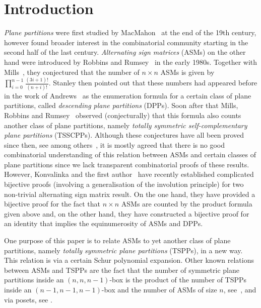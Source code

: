 \section{Introduction}
\emph{Plane partitions} were first studied by MacMahon~\cite{MacMahon97} at the end of the 19th century, however found broader interest in the combinatorial community starting in the second half of the last century. \emph{Alternating sign matrices} (ASMs) on the other hand were introduced by Robbins and Rumsey~\cite{RobbinsRumsey86} in the early 1980s. Together with Mills~\cite{MillsRobbinsRumsey82}, they conjectured that the number of $n \times n$ ASMs is given by $\prod_{i=0}^{n-1} \frac{(3i+1)!}{(n+i)!}$. Stanley then pointed out that these numbers had appeared before in the work of Andrews~\cite{Andrews79} as the enumeration formula for a certain class of plane partitions, called \emph{descending plane partitions} (DPPs). Soon after that Mills, Robbins and Rumsey~\cite{MillsRobbinsRumsey86} observed (conjecturally) that this formula also counts another class of plane partitions, namely \emph{totally symmetric self-complementary plane partitions} (TSSCPPs). Although these conjectures have all been proved since then, see among others~\cite{Andrews94,Zeilberger96}, it is mostly agreed that there is no good combinatorial understanding of this relation between ASMs and certain classes of plane partitions since we lack transparent combinatorial proofs of these results. However, Konvalinka and the first author~\cite{cube,FischerKonvalinka20plus} have recently established complicated bijective proofs (involving a generalisation of the involution principle) for two non-trivial alternating sign matrix result. On the one hand, they have provided a bijective proof for the fact that $n \times n$ ASMs are counted by the product formula given above and, on the other hand, they have constructed a bijective proof for 
an identity that implies the equinumerosity of ASMs and DPPs.

One purpose of this paper is to relate ASMs to yet another class of plane partitions, namely \emph{totally symmetric plane partitions} (TSPPs), in a new way. This relation is via a certain Schur polynomial expansion. 
Other known relations between ASMs and TSPPs are the fact that the number of symmetric plane partitions inside an \mbox{$(n,n,n-1)$}-box is the product of the number of TSPPs inside an $(n-1,n-1,n-1)$-box and the number of ASMs of size $n$, see~\cite{Fischer05}, and via posets, see \cite[Section 8]{Striker11}.


